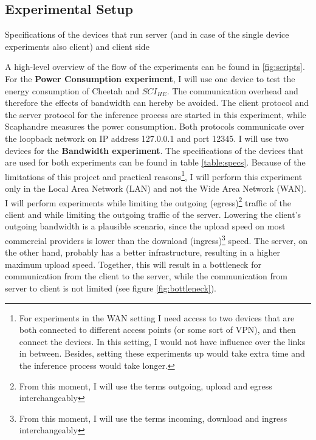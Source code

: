 \documentclass[../thesis.tex]{subfiles}
\begin{document}
\subsection{Experimental Setup}\label{subsection:setup}
\begin{table}[ht]
    \begin{adjustbox}{width=\columnwidth,center}
        
    \end{adjustbox}
    \caption{Specifications of the devices that run server (and in case of the single device experiments also client) and client side}
    \label{table:specs}
\end{table}

A high-level overview of the flow of the experiments can be found in \autoref{fig:scripts}. For the \textbf{Power Consumption experiment}, I will use one device to test the energy consumption of Cheetah and $SCI_{HE}$. The communication overhead and therefore the effects of bandwidth can hereby be avoided. The client protocol and the server protocol for the inference process are started in this experiment, while Scaphandre measures the power consumption. Both protocols communicate over the loopback network on IP address 127.0.0.1 and port 12345. I will use two devices for the \textbf{Bandwidth experiment}. The specifications of the devices that are used for both experiments can be found in table \autoref{table:specs}. Because of the limitations of this project and practical reasons\footnote{For experiments in the WAN setting I need access to two devices that are both connected to different access points (or some sort of VPN), and then connect the devices. In this setting, I would not have influence over the links in between. Besides, setting these experiments up would take extra time and the inference process would take longer.}, I will perform this experiment only in the Local Area Network (LAN) and not the Wide Area Network (WAN).  I will perform experiments while limiting the outgoing (egress)\footnote{From this moment, I will use the terms outgoing, upload and egress interchangeably} traffic of the client and while limiting the outgoing traffic of the server. Lowering the client's outgoing bandwidth is a plausible scenario, since the upload speed on most commercial providers is lower than the download (ingress)\footnote{From this moment, I will use the terms incoming, download and ingress interchangeably} speed. The server, on the other hand, probably has a better infrastructure, resulting in a higher maximum upload speed. Together, this will result in a bottleneck for communication from the client to the server, while the communication from server to client is not limited (see figure \ref{fig:bottleneck}).
\end{document}
